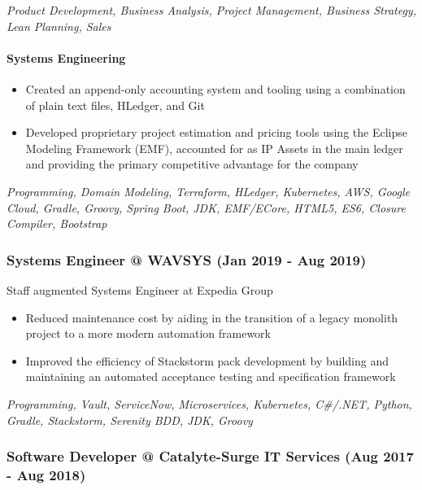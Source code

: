 \emph{Product Development, Business Analysis, Project Management,
Business Strategy, Lean Planning, Sales}

\hypertarget{systems-engineering}{%
\paragraph{Systems Engineering}\label{systems-engineering}}

\begin{itemize}
\tightlist
\item
  Created an append-only accounting system and tooling using a
  combination of plain text files, HLedger, and Git
\item
  Developed proprietary project estimation and pricing tools using the
  Eclipse Modeling Framework (EMF), accounted for as IP Assets in the
  main ledger and providing the primary competitive advantage for the
  company
\end{itemize}

\emph{Programming, Domain Modeling, Terraform, HLedger, Kubernetes, AWS,
Google Cloud, Gradle, Groovy, Spring Boot, JDK, EMF/ECore, HTML5, ES6,
Closure Compiler, Bootstrap}

\hypertarget{systems-engineer-wavsys-jan-2019---aug-2019}{%
\subsubsection{Systems Engineer @ WAVSYS (Jan 2019 - Aug
2019)}\label{systems-engineer-wavsys-jan-2019---aug-2019}}

Staff augmented Systems Engineer at Expedia Group

\begin{itemize}
\tightlist
\item
  Reduced maintenance cost by aiding in the transition of a legacy
  monolith project to a more modern automation framework
\item
  Improved the efficiency of Stackstorm pack development by building and
  maintaining an automated acceptance testing and specification
  framework
\end{itemize}

\emph{Programming, Vault, ServiceNow, Microservices, Kubernetes,
C\#/.NET, Python, Gradle, Stackstorm, Serenity BDD, JDK, Groovy}

\hypertarget{software-developer-catalyte-surge-it-services-aug-2017---aug-2018}{%
\subsubsection{Software Developer @ Catalyte-Surge IT Services (Aug 2017
- Aug
2018)}\label{software-developer-catalyte-surge-it-services-aug-2017---aug-2018}}

